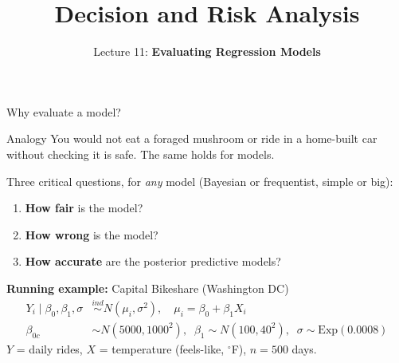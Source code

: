 \documentclass[aspectratio=43,11pt]{beamer}
\title{Decision and Risk Analysis}
\subtitle{Lecture 11: \textbf{Evaluating Regression Models}}
\author{}
\date{\color{aggiemaroon}{DAEN 427 / ISEN 427 / ISEN 627 - Fall 2026\\
      \textbf{Alexander Abuabara}}}
\begin{document}
\begin{frame}
  \titlepage
\end{frame}

\begin{frame}{}
  \tableofcontents
\end{frame}


\begin{frame}{Why evaluate a model?}
  \begin{block}{Analogy}
    You would not eat a foraged mushroom or ride in a home-built car without checking it is safe. The same holds for models.
  \end{block}
  Three critical questions, for \emph{any} model (Bayesian or frequentist, simple or big):
  \begin{enumerate}
    \item \textbf{How fair} is the model?
    \item \textbf{How wrong} is the model?
    \item \textbf{How accurate} are the posterior predictive models?
  \end{enumerate}
  \vspace{0.4em}
  \textbf{Running example:} Capital Bikeshare (Washington DC)
  \begin{align*}
    Y_i \mid \beta_0,\beta_1,\sigma &\overset{ind}{\sim} N(\mu_i,\sigma^2), \quad \mu_i=\beta_0+\beta_1X_i\\
    \beta_{0c}&\sim N(5000,1000^2),\;\; \beta_1\sim N(100,40^2),\;\; \sigma\sim\text{Exp}(0.0008)
  \end{align*}
  $Y$ = daily rides, $X$ = temperature (feels-like, $^\circ$F), $n=500$ days.
\end{frame}
\end{document}
